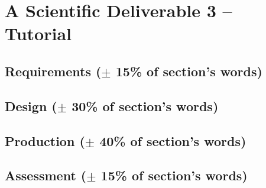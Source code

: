 \section{A Scientific Deliverable 3 -- Tutorial}
% 
\subsection{Requirements ($\pm$ 15\% of section's words)}

\subsection{Design ($\pm$ 30\% of section's words)}

\subsection{Production ($\pm$ 40\% of section's words)}

\subsection{Assessment ($\pm$ 15\% of section's words)}

